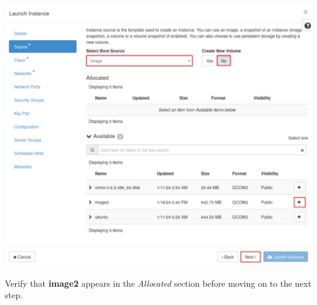 \documentclass[letterpaper, 12pt]{article}
\begin{document}
\begin{enumerate}
    \begin{center}
        \includegraphics[width=\linewidth]{images/part4/step4.png}
    \end{center}

    \begin{stopbox}
        Verify that \textbf{image2} appears in the \textit{Allocated} section before moving on to the next step.
    \end{stopbox}


\end{enumerate}
\end{document}
